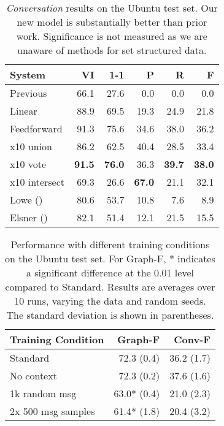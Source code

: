 \documentclass[11pt,a4paper]{article}
\begin{document}
\begin{table}
  \centering
    \setlength{\tabcolsep}{5pt}
  \begin{tabular}{l rrrrr}
    \toprule
    System                          & VI & 1-1 & P & R & F \\
    \midrule
    Previous                        & 66.1 & 27.6 &  0.0 &  0.0 &  0.0 \\
    Linear                          & 88.9 & 69.5 & 19.3 & 24.9 & 21.8 \\
    Feedforward                     & 91.3 & 75.6 & 34.6 & 38.0 & 36.2 \\
    \phantom{a}x10 union            & 86.2 & 62.5 & 40.4 & 28.5 & 33.4 \\
    \phantom{a}x10 vote             & \textbf{91.5} & \textbf{76.0} & 36.3 & \textbf{39.7} & \textbf{38.0} \\
    \phantom{a}x10 intersect        & 69.3 & 26.6 & \textbf{67.0} & 21.1 & 32.1 \\
    \addlinespace[5pt]
    Lowe (\citeyear{Lowe:2017:DD})  & 80.6 & 53.7 & 10.8 &  7.6 &  8.9 \\
    Elsner (\citeyear{elsner:2008}) & 82.1 & 51.4 & 12.1 & 21.5 & 15.5 \\
    \bottomrule
  \end{tabular}
  \caption{\label{tab:res-conv}
  \emph{Conversation} results on the Ubuntu test set.
  Our new model is substantially better than prior work.
  Significance is not measured as we are unaware of methods for set structured data.
  }
\end{table}

\begin{table}
  \centering
    \setlength{\tabcolsep}{5pt}
  \begin{tabular}{l rr}
    \toprule
    Training Condition & Graph-F               & Conv-F     \\
    \midrule
    Standard           & 72.3\phantom{*} (0.4) & 36.2 (1.7) \\
    No context         & 72.3\phantom{*} (0.2) & 37.6 (1.6) \\
    1k random msg      & 63.0*           (0.4) & 21.0 (2.3) \\
    2x 500 msg samples & 61.4*           (1.8) & 20.4 (3.2) \\
    \bottomrule
  \end{tabular}
  \caption{\label{tab:res-data}
  Performance with different training conditions on the Ubuntu test set.
  For Graph-F, * indicates a significant difference at the 0.01 level compared to Standard.
  Results are averages over 10 runs, varying the data and random seeds.
  The standard deviation is shown in parentheses.
  }
\end{table}
\end{document}
